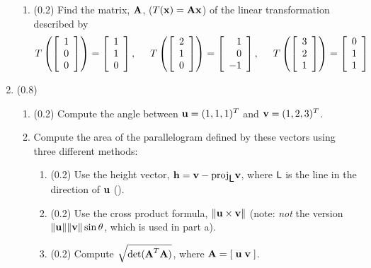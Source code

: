 \documentclass[11pt,titlepage,fleqn]{article}
\begin{document}
\begin{enumerate}
\begin{enumerate}
\item (0.2) Find the matrix, $\mbox{${\bf A}$}$, ($T(\mbox{${\bf x}$}) = \mbox{${\bf A}$}\mbox{${\bf x}$}$) of the linear transformation described by
%
\begin{equation*}
T \left( \left[ \begin{array}{r} 1 \\ 0 \\ 0  \end{array} \right] \right) = \left[ \begin{array}{r} 1 \\ 1 \\ 0 \end{array} \right],
\hspace{0.5cm}
T \left( \left[ \begin{array}{r} 2 \\ 1 \\ 0  \end{array} \right] \right) = \left[ \begin{array}{r} 1 \\ 0 \\ -1 \end{array} \right],
\hspace{0.5cm}
T \left( \left[ \begin{array}{r} 3 \\ 2 \\ 1  \end{array} \right] \right) = \left[ \begin{array}{r} 0 \\ 1 \\ 1 \end{array} \right]
\end{equation*}

\end{enumerate}


\pagebreak
\item (0.8) 
\begin{enumerate}
\item (0.2) Compute the angle between $\mbox{${\bf u}$} = (1,1,1)^T$ and $\mbox{${\bf v}$} = (1,2,3)^T$.

\item Compute the area of the parallelogram defined by these vectors using three different methods:
\begin{enumerate}
\item (0.2) Use the height vector, $\mbox{${\bf h}$} = \mbox{${\bf v}$} - \mathrm{proj}_{\mbox{${\sf L}$}} \mbox{${\bf v}$}$, where $\mbox{${\sf L}$}$ is the line in the direction of $\mbox{${\bf u}$}$ ().
\item (0.2) Use the cross product formula, $\| \mbox{${\bf u}$} \times \mbox{${\bf v}$} \|$ (note: {\em not} the version $\|\mbox{${\bf u}$}\|\|\mbox{${\bf v}$}\|\sin\theta$, which is used in part a).
\item (0.2) Compute $\sqrt{\det(\mbox{${\bf A}$}^T \mbox{${\bf A}$})}$, where $\mbox{${\bf A}$} = [\;\mbox{${\bf u}$} \; \mbox{${\bf v}$}\;]$.
\end{enumerate}


\end{enumerate}
\end{enumerate}
\end{document}

